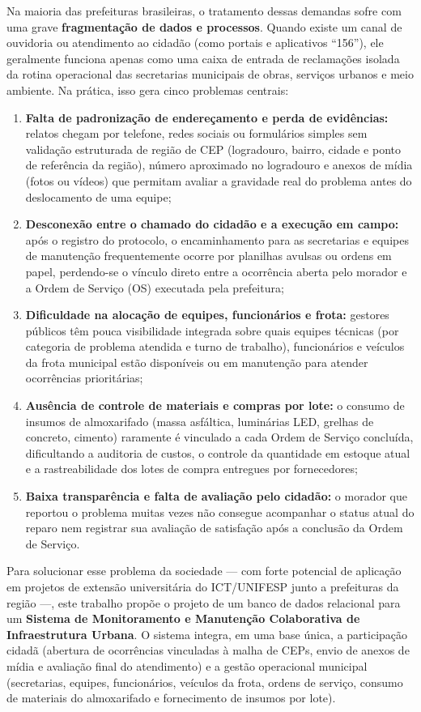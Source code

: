 \documentclass[12pt,a4paper]{article}
\begin{document}
Na maioria das prefeituras brasileiras, o tratamento dessas demandas sofre com uma grave \textbf{fragmentação de dados e processos}. Quando existe um canal de ouvidoria ou atendimento ao cidadão (como portais e aplicativos ``156''), ele geralmente funciona apenas como uma caixa de entrada de reclamações isolada da rotina operacional das secretarias municipais de obras, serviços urbanos e meio ambiente. Na prática, isso gera cinco problemas centrais:

\begin{enumerate}
  \item \textbf{Falta de padronização de endereçamento e perda de evidências:} relatos chegam por telefone, redes sociais ou formulários simples sem validação estruturada de região de CEP (logradouro, bairro, cidade e ponto de referência da região), número aproximado no logradouro e anexos de mídia (fotos ou vídeos) que permitam avaliar a gravidade real do problema antes do deslocamento de uma equipe;
  \item \textbf{Desconexão entre o chamado do cidadão e a execução em campo:} após o registro do protocolo, o encaminhamento para as secretarias e equipes de manutenção frequentemente ocorre por planilhas avulsas ou ordens em papel, perdendo-se o vínculo direto entre a ocorrência aberta pelo morador e a Ordem de Serviço (OS) executada pela prefeitura;
  \item \textbf{Dificuldade na alocação de equipes, funcionários e frota:} gestores públicos têm pouca visibilidade integrada sobre quais equipes técnicas (por categoria de problema atendida e turno de trabalho), funcionários e veículos da frota municipal estão disponíveis ou em manutenção para atender ocorrências prioritárias;
  \item \textbf{Ausência de controle de materiais e compras por lote:} o consumo de insumos de almoxarifado (massa asfáltica, luminárias LED, grelhas de concreto, cimento) raramente é vinculado a cada Ordem de Serviço concluída, dificultando a auditoria de custos, o controle da quantidade em estoque atual e a rastreabilidade dos lotes de compra entregues por fornecedores;
  \item \textbf{Baixa transparência e falta de avaliação pelo cidadão:} o morador que reportou o problema muitas vezes não consegue acompanhar o status atual do reparo nem registrar sua avaliação de satisfação após a conclusão da Ordem de Serviço.
\end{enumerate}

Para solucionar esse problema da sociedade --- com forte potencial de aplicação em projetos de extensão universitária do ICT/UNIFESP junto a prefeituras da região ---, este trabalho propõe o projeto de um banco de dados relacional \cite{elmasri2019} para um \textbf{Sistema de Monitoramento e Manutenção Colaborativa de Infraestrutura Urbana}. O sistema integra, em uma base única, a participação cidadã (abertura de ocorrências vinculadas à malha de CEPs, envio de anexos de mídia e avaliação final do atendimento) e a gestão operacional municipal (secretarias, equipes, funcionários, veículos da frota, ordens de serviço, consumo de materiais do almoxarifado e fornecimento de insumos por lote).
\end{document}
